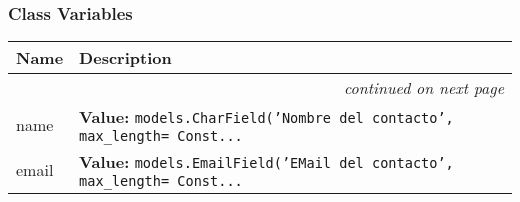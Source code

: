 
  \subsubsection{Class Variables}

    \vspace{-1cm}
\hspace{\varindent}\begin{longtable}{|p{\varnamewidth}|p{\vardescrwidth}|l}
\cline{1-2}
\cline{1-2} \centering \textbf{Name} & \centering \textbf{Description}& \\
\cline{1-2}
\endhead\cline{1-2}\multicolumn{3}{r}{\small\textit{continued on next page}}\\\endfoot\cline{1-2}
\endlastfoot\raggedright n\-a\-m\-e\- & \raggedright \textbf{Value:} 
{\tt models.CharField('Nombre del contacto', max\_length= Const\texttt{...}}&\\
\cline{1-2}
\raggedright e\-m\-a\-i\-l\- & \raggedright \textbf{Value:} 
{\tt models.EmailField('EMail del contacto', max\_length= Const\texttt{...}}&\\
\cline{1-2}
\end{longtable}

